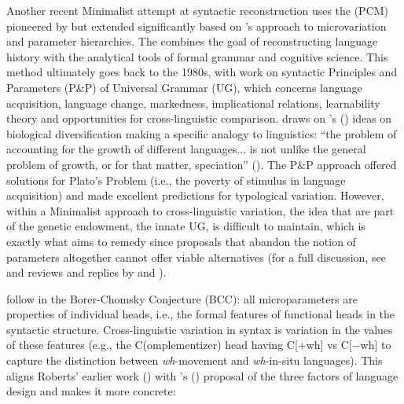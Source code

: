 \documentclass[output=paper,colorlinks,citecolor=brown]{langscibook}
\begin{document}
Another recent Minimalist attempt at syntactic reconstruction uses the  (PCM) pioneered by \citet{mm:guardiano_parametric_2005} but extended significantly based on \citet{mm:roberts_parameter_2019}'s approach to microvariation and parameter hierarchies. The  combines the goal of reconstructing language history with the analytical tools of formal grammar and cognitive science. This method ultimately goes back to the 1980s, with work on syntactic Principles and Parameters (P\&P) of Universal Grammar (UG), which concerns language acquisition, language change, markedness, implicational relations, learnability theory and opportunities for cross-linguistic comparison. \citet{mm:chomsky_binding_1980} draws on \citeauthor{mm:jacob_darwinism_1977}'s (\citeyear{mm:jacob_darwinism_1977}) ideas on biological diversification making a specific analogy to linguistics: ``the problem of accounting for the growth of different languages... is not unlike the general problem of growth, or for that matter, speciation'' (\cite[67]{mm:chomsky_binding_1980}). The P\&P approach offered solutions for Plato's Problem (i.e., the poverty of stimulus in language acquisition) and made excellent predictions for typological variation. However, within a Minimalist approach to cross\hyp linguistic variation, the idea that  are part of the genetic endowment, the innate UG, is difficult to maintain, which is exactly what \citet{mm:roberts_parameter_2019} aims to remedy since proposals that abandon the notion of parameters altogether cannot offer viable alternatives (for a full discussion, see \citealt{mm:newmeyer_against_2005} and reviews and replies by \citealt{mm:dryer_review_2007} and \cites{mm:Walkden2014, mm:berwick_biolinguistic_2011}{mm:boeckx_thoughts_2015}[11--13]{mm:roberts_parameter_2019}). 

\citet{mm:ledgeway_cambridge_2017} follow \citet[6]{mm:chomsky_minimalist_1995} in the Borer-Chomsky Conjecture (BCC): all microparameters are  properties of individual heads, i.e., the formal features of functional heads in the syntactic structure. Cross-linguistic variation in syntax is variation in the values of these features (e.g., the C(omplementizer) head having C[+wh] vs C[−wh] to capture the distinction between \textit{wh}-movement and \textit{wh}-in-situ languages).  This aligns Roberts' earlier work (\citealt{mm:clark_computational_1993, mm:roberts_restructuring_1997, mm:roberts_syntactic_2003, mm:roberts_diachronic_2007}) with \citeauthor{mm:chomsky_three_2005}'s (\citeyear{mm:chomsky_three_2005}) proposal of the three factors of language design and makes it more concrete:
\end{document}
